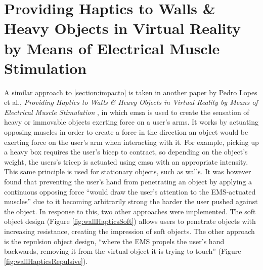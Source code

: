 \section{Providing Haptics to Walls \& Heavy Objects in Virtual Reality by Means of Electrical Muscle Stimulation}
                        
A similar approach to \autoref{section:impacto} is taken in another paper by Pedro Lopes et al., \textit{Providing Haptics to Walls \& Heavy Objects in Virtual Reality by Means of Electrical Muscle Stimulation} \autocite{wallHaptics}, in which \gls{emsa} is used to create the sensation of heavy or immovable objects exerting force on a user's arms.
\newline
It works by actuating opposing muscles in order to create a force in the direction an object would be exerting force on the user's arm when interacting with it. For example, picking up a heavy box requires the user's bicep to contract, so depending on the object's weight, the users's tricep is actuated using \gls{emsa} with an appropriate intensity. This same principle is used for stationary objects, such as walls.
\newline
It was however found that preventing the user's hand from penetrating an object by applying a continuous opposing force \enquote{would draw the user’s attention to the EMS-actuated muscles} \autocite[p. ~2]{wallHaptics} due to it becoming arbitrarily strong the harder the user pushed against the object.
In response to this, two other approaches were implemented. The soft object design (Figure \autoref{fig:wallHapticsSoft}) allows users to penetrate objects with increasing resistance, creating the impression of soft objects. The other approach is the repulsion object design, \enquote{where the EMS propels the user’s hand backwards, removing it from the virtual object it is trying to touch} \autocite[p. ~3]{wallHaptics} (Figure \autoref{fig:wallHapticsRepulsive}).

